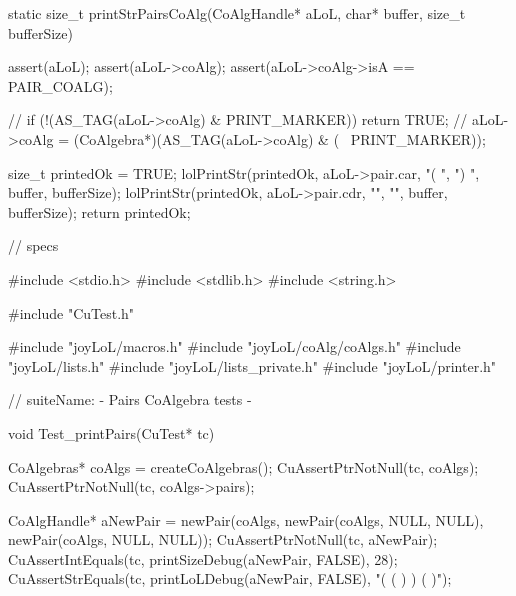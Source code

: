 static size_t printStrPairsCoAlg(CoAlgHandle* aLoL,
                                 char* buffer, size_t bufferSize) {
  assert(aLoL);
  assert(aLoL->coAlg);
  assert(aLoL->coAlg->isA == PAIR_COALG);

//  if (!(AS_TAG(aLoL->coAlg) & PRINT_MARKER)) return TRUE;
//  aLoL->coAlg = (CoAlgebra*)(AS_TAG(aLoL->coAlg) & (~ PRINT_MARKER));

  size_t printedOk = TRUE;
  lolPrintStr(printedOk, aLoL->pair.car, "( ", ") ", buffer, bufferSize);
  lolPrintStr(printedOk, aLoL->pair.cdr, "", "", buffer, bufferSize);
  return printedOk;
}
\stoptyping

\starttyping
// specs

#include <stdio.h>
#include <stdlib.h>
#include <string.h>

#include "CuTest.h"

#include "joyLoL/macros.h"
#include "joyLoL/coAlg/coAlgs.h"
#include "joyLoL/lists.h"
#include "joyLoL/lists_private.h"
#include "joyLoL/printer.h"

// suiteName: - Pairs CoAlgebra tests -

void Test_printPairs(CuTest* tc) {
  CoAlgebras* coAlgs = createCoAlgebras();
  CuAssertPtrNotNull(tc, coAlgs);
  CuAssertPtrNotNull(tc, coAlgs->pairs);

  CoAlgHandle* aNewPair = newPair(coAlgs,
                               newPair(coAlgs, NULL, NULL),
                               newPair(coAlgs, NULL, NULL));
  CuAssertPtrNotNull(tc, aNewPair);
  CuAssertIntEquals(tc, printSizeDebug(aNewPair, FALSE), 28);
  CuAssertStrEquals(tc, printLoLDebug(aNewPair, FALSE), "( ( ) ) ( )");
}
\stoptyping
